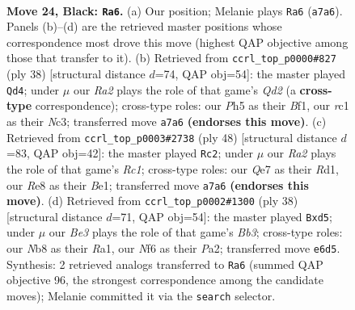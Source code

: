 \documentclass[11pt]{article}
\begin{document}
\clearpage

\begin{figure}[p]\centering
\begin{subfigure}{0.46\textwidth}\centering
\resizebox{\linewidth}{!}{%
\newchessgame
\chessboard[
  setfen={1n2r1k1/r3qpp1/1p1pbn2/3Bp2p/P3P2N/2N3P1/2PQ1P1P/R1R3K1 b - - 10 24},
  showmover=false,
  pgfstyle=straightmove, color=movearrow, markmove={a7-a6}
]}
\caption{}
\end{subfigure}\hfill
\begin{subfigure}{0.46\textwidth}\centering
\resizebox{\linewidth}{!}{%
\newchessgame
\chessboard[
  setfen={1k1r3r/1p3pp1/pqb1p2p/2npP3/1P3P1P/P1N4R/2PQ2P1/1K1R1B2 w - - 1 20},
  showmover=false,
  pgfstyle=straightmove, color=movearrow, markmove={d2-d4}
]}
\caption{}
\end{subfigure}
\\[4pt]
\begin{subfigure}{0.46\textwidth}\centering
\resizebox{\linewidth}{!}{%
\newchessgame
\chessboard[
  setfen={2r1r1k1/2bq2pp/2p2p2/p2p4/3Pn3/1P1Q1N2/P4PPP/2RRB1K1 w - - 2 25},
  showmover=false,
  pgfstyle=straightmove, color=movearrow, markmove={c1-c2}
]}
\caption{}
\end{subfigure}\hfill
\begin{subfigure}{0.46\textwidth}\centering
\resizebox{\linewidth}{!}{%
\newchessgame
\chessboard[
  setfen={1r2r1k1/2pq1pp1/2n4p/pp1bp3/8/1BPP1N1P/PPQ2PP1/R3R1K1 w - - 0 20},
  showmover=false,
  pgfstyle=straightmove, color=movearrow, markmove={b3-d5}
]}
\caption{}
\end{subfigure}
\caption{\textbf{Move 24, Black: \texttt{Ra6}.} (a) Our position; Melanie plays \texttt{Ra6} (\texttt{a7a6}). Panels (b)--(d) are the retrieved master positions whose correspondence most drove this move (highest QAP objective among those that transfer to it). (b) Retrieved from \texttt{ccrl\_top\_p0000\#827} (ply 38) [structural distance $d$=74, QAP obj=54]: the master played \texttt{Qd4}; under $\mu$ our \emph{Ra2} plays the role of that game's \emph{Qd2} (a \textbf{cross-type} correspondence); cross-type roles: our \emph{P}h5 as their \emph{B}f1, our \emph{r}c1 as their \emph{N}c3; transferred move \texttt{a7a6} \textbf{(endorses this move)}. (c) Retrieved from \texttt{ccrl\_top\_p0003\#2738} (ply 48) [structural distance $d$=83, QAP obj=42]: the master played \texttt{Rc2}; under $\mu$ our \emph{Ra2} plays the role of that game's \emph{Rc1}; cross-type roles: our \emph{Q}e7 as their \emph{R}d1, our \emph{R}e8 as their \emph{B}e1; transferred move \texttt{a7a6} \textbf{(endorses this move)}. (d) Retrieved from \texttt{ccrl\_top\_p0002\#1300} (ply 38) [structural distance $d$=71, QAP obj=54]: the master played \texttt{Bxd5}; under $\mu$ our \emph{Be3} plays the role of that game's \emph{Bb3}; cross-type roles: our \emph{N}b8 as their \emph{R}a1, our \emph{N}f6 as their \emph{P}a2; transferred move \texttt{e6d5}. Synthesis: 2 retrieved analogs transferred to \texttt{Ra6} (summed QAP objective 96, the strongest correspondence among the candidate moves); Melanie committed it via the \texttt{search} selector.}
\label{fig:thought-m47}
\end{figure}
\end{document}
